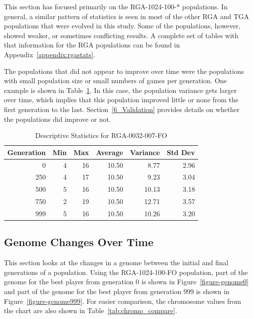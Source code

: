 This section has focused primarily on the RGA-1024-100-* populations. In
general, a similar pattern of statistics is seen in most of the other RGA and
TGA populations that were evolved in this study. Some of the populations,
however, showed weaker, or sometimes conflicting results. A complete set of
tables with that information for the RGA populations can be found in
Appendix~\ref{appendix:rgastats}.

The populations that did not appear to improve over time were the populations
with small population size or small numbers of games per generation. One example
is shown in Table~\ref{tab:6_RGA-0032-007-FO}. In this case, the population
variance gets larger over time, which implies that this population improved
little or none from the first generation to the last. Section~\ref{6_Validation}
provides details on whether the populations did improve or not.

\begin{table}[htbp]
\begin{center}
  \caption[RGA-0032-007-FO Statistics]{Descriptive Statistics for RGA-0032-007-FO}
  \begin{tabular}{ | r || r | r | r | r | r |}
  \hline
  Generation & Min    & Max    & Average & Variance & Std Dev \\ \hline \hline
      0      & 4      & 16     & 10.50  & 8.77   & 2.96 \\
      250    & 4      & 17     & 10.50  & 9.23   & 3.04 \\
      500    & 5      & 16     & 10.50  & 10.13  & 3.18 \\
      750    & 2      & 19     & 10.50  & 12.71  & 3.57 \\
      999    & 5      & 16     & 10.50  & 10.26  & 3.20 \\ \hline
    \end{tabular}
  \label{tab:6_RGA-0032-007-FO}%
\end{center}
\end{table}%

\subsection{Genome Changes Over Time} \label{6_genomeChanges}

This section looks at the changes in a genome between the initial and final
generations of a population. Using the RGA-1024-100-FO population, part of
the genome for the best player from generation 0 is shown in
Figure~\ref{figure-genome0} and part of the genome for the best player from
generation 999 is shown in Figure~\ref{figure-genome999}. For easier comparison,
the chromosome values from the chart are also shown in
Table~\ref{tab:chromo_compare}.

